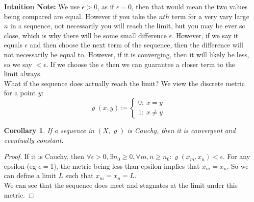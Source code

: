 \documentclass{article}
\newtheorem{cor}{Corollary}[section]
\begin{document}
\medskip
\textbf{Intuition Note:} We use $\epsilon > 0$, as if $\epsilon = 0$, then that would mean the two values being compared are equal. However if you take the $nth$ term for a very vary large $n$ in a sequence, not necessarily you will reach the limit, but you may be ever so close, which is why there will be some small difference $\epsilon$. However, if we say it equals $\epsilon$ and then choose the next term of the sequence, then the difference will not necessarily be equal to. However, if it is converging, then it will likely be less, so we say $< \epsilon$. If we choose the $\epsilon$ then we can guarantee a closer term to the limit always.\\

What if the sequence does actually reach the limit? We view the discrete metric for a point $y$:
\begin{equation*}
    \varrho(x, y) \coloneq \begin{cases}
        0: \ x = y\\
        1: \ x \neq y
    \end{cases}
\end{equation*}
\begin{cor}
If a sequence in $(X, \varrho)$ is Cauchy, then it is convergent and eventually constant.
\end{cor}
\begin{proof}
If it is Cauchy, then $\forall \epsilon > 0, \exists n_0 \geqslant 0, \forall m, n \geqslant n_0: \varrho(x_m, x_n) < \epsilon$. For any epsilon (eg $\epsilon = 1$), the metric being less than epsilon implies that $x_m = x_n$. So we can define a limit $L$ such that $x_m = x_n = L$.\\

We can see that the sequence does meet and stagnates at the limit under this metric. 
\end{proof}
\end{document}
